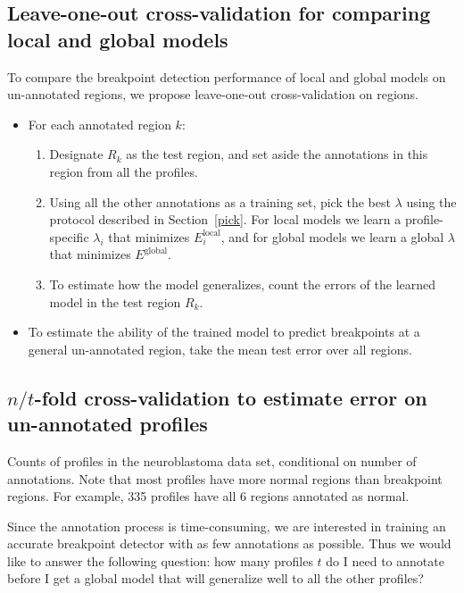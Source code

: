 \documentclass{bioinfo}
\begin{document}
\begin{methods}
\subsection{Leave-one-out cross-validation for comparing local and
  global models}
To compare the breakpoint detection performance of local and global
models on un-annotated regions, we propose leave-one-out
cross-validation on regions.
\begin{itemize}
\item For each annotated region $k$:
\begin{enumerate}
\item Designate $R_k$ as the test region, and set aside the
  annotations in this region from all the profiles.
\item Using all the other annotations as a training set, pick the best
  $\lambda$ using the protocol described in Section~\ref{pick}. For
  local models we learn a profile-specific $\lambda_i$ that minimizes
  $E_i^{\text{local}}$, and for global models we learn a global
  $\lambda$ that minimizes $E^{\text{global}}$.
\item To estimate how the model generalizes, count the errors of the
  learned model in the test region $R_k$.
\end{enumerate}
\item To estimate the ability of the trained model to predict
  breakpoints at a general un-annotated region, take the mean test
  error over all regions. 
\end{itemize}

\subsection{$n/t$-fold cross-validation to estimate error on
  un-annotated profiles}

\begin{table}[hb!]
\begin{center}

\end{center}
\caption{\label{table-annotation-profile-counts}
  Counts of profiles in the neuroblastoma data set, 
  conditional on number of annotations.
  Note that most profiles have more normal regions than breakpoint regions. 
  For example, 335 profiles have all 6 regions annotated as normal.}
\end{table}



Since the annotation process is time-consuming, we are interested in
training an accurate breakpoint detector with as few annotations as
possible. Thus we would like to answer the following question: how
many profiles $t$ do I need to annotate before I get a global model
that will generalize well to all the other profiles?


\end{methods}
\end{document}
